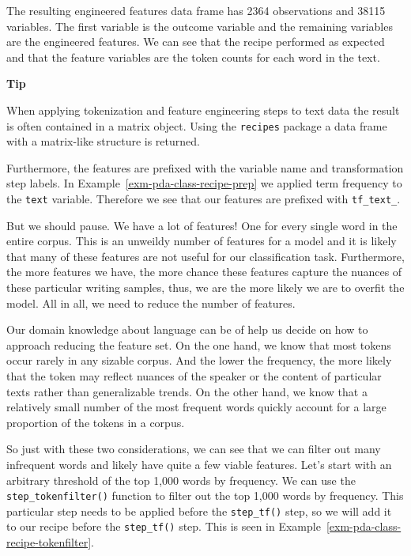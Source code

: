 \documentclass[
  letterpaper,
  DIV=11,
  numbers=noendperiod]{scrreprt}
\theoremstyle{definition}
\theoremstyle{remark}
\begin{document}
The resulting engineered features data frame has 2364 observations and
38115 variables. The first variable is the outcome variable and the
remaining variables are the engineered features. We can see that the
recipe performed as expected and that the feature variables are the
token counts for each word in the text.

\begin{tcolorbox}[enhanced jigsaw, leftrule=.75mm, colframe=quarto-callout-color-frame, colback=white, rightrule=.15mm, opacityback=0, arc=.35mm, breakable, bottomrule=.15mm, left=2mm, toprule=.15mm]

\textbf{ Tip}

When applying tokenization and feature engineering steps to text data
the result is often contained in a matrix object. Using the
\texttt{recipes} package a data frame with a matrix-like structure is
returned.

Furthermore, the features are prefixed with the variable name and
transformation step labels. In Example~\ref{exm-pda-class-recipe-prep}
we applied term frequency to the \texttt{text} variable. Therefore we
see that our features are prefixed with \texttt{tf\_text\_}.

\end{tcolorbox}

But we should pause. We have a lot of features! One for every single
word in the entire corpus. This is an unweildy number of features for a
model and it is likely that many of these features are not useful for
our classification task. Furthermore, the more features we have, the
more chance these features capture the nuances of these particular
writing samples, thus, we are the more likely we are to overfit the
model. All in all, we need to reduce the number of features.

Our domain knowledge about language can be of help us decide on how to
approach reducing the feature set. On the one hand, we know that most
tokens occur rarely in any sizable corpus. And the lower the frequency,
the more likely that the token may reflect nuances of the speaker or the
content of particular texts rather than generalizable trends. On the
other hand, we know that a relatively small number of the most frequent
words quickly account for a large proportion of the tokens in a corpus.

So just with these two considerations, we can see that we can filter out
many infrequent words and likely have quite a few viable features. Let's
start with an arbitrary threshold of the top 1,000 words by frequency.
We can use the \texttt{step\_tokenfilter()} function to filter out the
top 1,000 words by frequency. This particular step needs to be applied
before the \texttt{step\_tf()} step, so we will add it to our recipe
before the \texttt{step\_tf()} step. This is seen in
Example~\ref{exm-pda-class-recipe-tokenfilter}.
\end{document}

